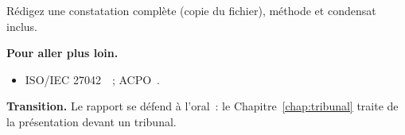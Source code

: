 \begin{boxexo}[title={\ding{45}\quad Exercice~18.10. Constatation \niveauexpert}]
Rédigez une constatation complète (copie du fichier), méthode et condensat
inclus.
\end{boxexo}

\bigskip

\begin{boxinfo}
\textbf{Pour aller plus loin.}
\begin{itemize}
    \item ISO/IEC 27042~\cite{iso27042}~; ACPO~\cite{acpo2012}.
\end{itemize}
\end{boxinfo}

\begin{boxinfo}
\textbf{Transition.} Le rapport se défend à l'oral~: le
Chapitre~\ref{chap:tribunal} traite de la présentation devant un tribunal.
\end{boxinfo}
